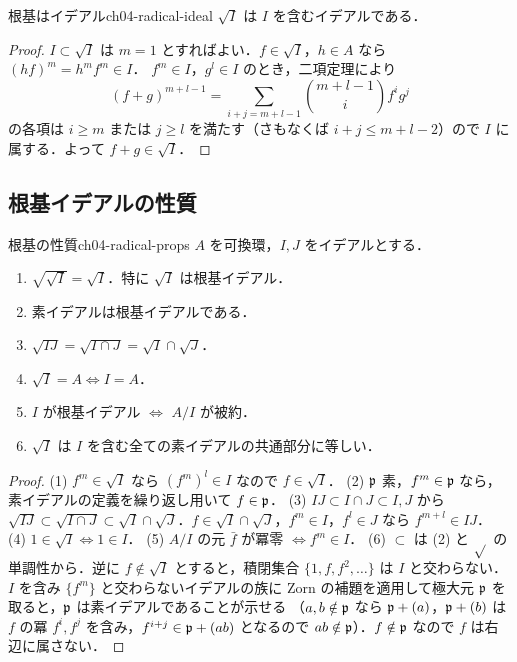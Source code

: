 \begin{mylem}{根基はイデアル}{ch04-radical-ideal}
$\sqrt I$ は $I$ を含むイデアルである．
\end{mylem}

\begin{proof}
$I\subset\sqrt I$ は $m=1$ とすればよい．$f\in\sqrt I$，$h\in A$ なら $(hf)^m=h^mf^m\in I$．
$f^m\in I$，$g^l\in I$ のとき，二項定理により
\[
  (f+g)^{m+l-1}=\sum_{i+j=m+l-1}\binom{m+l-1}{i}f^ig^j
\]
の各項は $i\ge m$ または $j\ge l$ を満たす（さもなくば $i+j\le m+l-2$）ので $I$ に属する．よって $f+g\in\sqrt I$．
\end{proof}

\subsection{根基イデアルの性質}

\begin{myprop}{根基の性質}{ch04-radical-props}
$A$ を可換環，$I,J$ をイデアルとする．
\begin{enumerate}
  \item $\sqrt{\sqrt I}=\sqrt I$．特に $\sqrt I$ は根基イデアル．
  \item 素イデアルは根基イデアルである．
  \item $\sqrt{IJ}=\sqrt{I\cap J}=\sqrt I\cap\sqrt J$．
  \item $\sqrt I=A\iff I=A$．
  \item $I$ が根基イデアル $\iff$ $A/I$ が被約．
  \item $\sqrt I$ は $I$ を含む全ての素イデアルの共通部分に等しい．
\end{enumerate}
\end{myprop}

\begin{proof}
(1) $f^m\in\sqrt I$ なら $(f^m)^l\in I$ なので $f\in\sqrt I$．
(2) $\mathfrak{p}$ 素，$f^m\in\mathfrak{p}$ なら，素イデアルの定義を繰り返し用いて $f\in\mathfrak{p}$．
(3) $IJ\subset I\cap J\subset I,J$ から $\sqrt{IJ}\subset\sqrt{I\cap J}\subset\sqrt I\cap\sqrt J$．$f\in\sqrt I\cap\sqrt J$，$f^m\in I$，$f^l\in J$ なら $f^{m+l}\in IJ$．
(4) $1\in\sqrt I\iff 1\in I$．
(5) $A/I$ の元 $\bar f$ が冪零 $\iff f^m\in I$．
(6) $\subset$ は (2) と $\sqrt{}$ の単調性から．逆に $f\notin\sqrt I$ とすると，積閉集合 $\{1,f,f^2,\dots\}$ は $I$ と交わらない．
$I$ を含み $\{f^m\}$ と交わらないイデアルの族に Zorn の補題を適用して極大元 $\mathfrak{p}$ を取ると，$\mathfrak{p}$ は素イデアルであることが示せる
（$a,b\notin\mathfrak{p}$ なら $\mathfrak{p}+(a)$，$\mathfrak{p}+(b)$ は $f$ の冪 $f^i,f^j$ を含み，$f^{i+j}\in\mathfrak{p}+(ab)$ となるので $ab\notin\mathfrak{p}$）．$f\notin\mathfrak{p}$ なので $f$ は右辺に属さない．
\end{proof}


